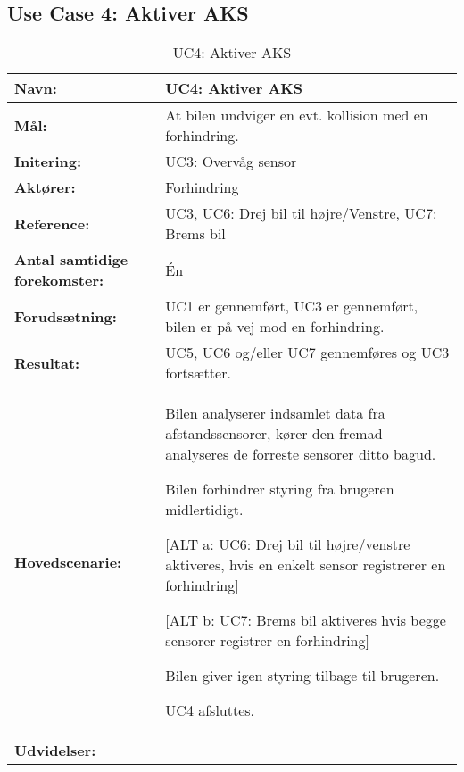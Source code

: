 \subsection{Use Case 4: Aktiver AKS}
\begin{table}[h]
\begin{tabularx}{\textwidth}{| L{3.3 cm} | Z |} \hline

\textbf{Navn:} 						& UC4: Aktiver AKS\\ \hline
\textbf{Mål:}						& At bilen undviger en evt. kollision med en forhindring. \\ \hline
\textbf{Initering:}					& UC3: Overvåg sensor \\ \hline
\textbf{Aktører:} 					& Forhindring \\ \hline
\textbf{Reference:} 				& UC3, UC6: Drej bil til højre/Venstre, UC7: Brems bil \\ \hline
\textbf{Antal samtidige forekomster:} & Én \\ \hline
\textbf{Forudsætning:} 				& UC1 er gennemført, UC3 er gennemført, bilen er på vej mod en forhindring. \\ \hline
\textbf{Resultat:}					& UC5, UC6 og/eller UC7 gennemføres og UC3 fortsætter. \\ \hline
\textbf{Hovedscenarie:}				& 

\begin{packed_enum}
\item Bilen analyserer indsamlet data fra afstandssensorer, kører den fremad analyseres de forreste sensorer ditto bagud.
\item Bilen forhindrer styring fra brugeren midlertidigt.
\item 
	\begin{packed_item}\itemsep1pt \parskip0pt 
	\item {[}ALT a: UC6: Drej bil til højre/venstre aktiveres, hvis en enkelt sensor registrerer en forhindring{]}
	\item {[}ALT b: UC7: Brems bil aktiveres hvis begge sensorer registrer en forhindring{]}
	\end{packed_item}
\item Bilen giver igen styring tilbage til brugeren.
\item UC4 afsluttes.
\end{packed_enum} \\ \hline
\textbf{Udvidelser:}				&  

\\ \hline
\end{tabularx}
\caption{UC4: Aktiver AKS}
\label{tbl:UC4}
\end{table}